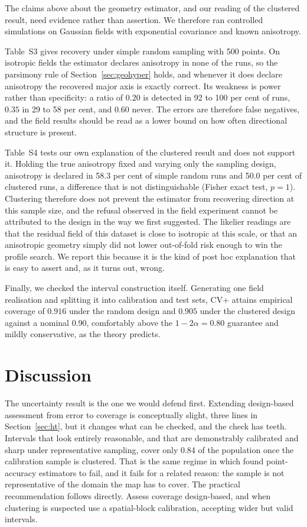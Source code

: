 \documentclass[preprint,12pt,authoryear]{elsarticle}
\begin{document}
The claims above about the geometry estimator, and our reading of the clustered
result, need evidence rather than assertion. We therefore ran controlled
simulations on Gaussian fields with exponential covariance and known anisotropy.

Table~S3 gives recovery under simple random sampling with 500
points. On isotropic fields the estimator declares anisotropy in none of the
runs, so the parsimony rule of Section~\ref{sec:geohyper} holds, and whenever it
does declare anisotropy the recovered major axis is exactly correct. Its
weakness is power rather than specificity: a ratio of $0.20$ is detected in 92
to 100 per cent of runs, $0.35$ in 29 to 58 per cent, and $0.60$ never. The
errors are therefore false negatives, and the field results should be read as a
lower bound on how often directional structure is present.

Table~S4 tests our own explanation of the clustered result and does
not support it. Holding the true anisotropy fixed and varying only the sampling
design, anisotropy is declared in 58.3 per cent of simple random runs and 50.0
per cent of clustered runs, a difference that is not distinguishable
(Fisher exact test, $p = 1$). Clustering therefore does not prevent the
estimator from recovering direction at this sample size, and the refusal
observed in the field experiment cannot be attributed to the design in the way
we first suggested. The likelier readings are that the residual field of this
dataset is close to isotropic at this scale, or that an anisotropic geometry
simply did not lower out-of-fold risk enough to win the profile search. We
report this because it is the kind of post hoc explanation that is easy to
assert and, as it turns out, wrong.

Finally, we checked the interval construction itself. Generating one field
realisation and splitting it into calibration and test sets, CV+ attains
empirical coverage of $0.916$ under the random design and $0.905$ under the
clustered design against a nominal $0.90$, comfortably above the
$1-2\alpha = 0.80$ guarantee and mildly conservative, as the theory predicts.

\section{Discussion}

The uncertainty result is the one we would defend first. Extending design-based
assessment from error to coverage is conceptually slight, three lines in
Section~\ref{sec:ht}, but it changes what can be checked, and the check has
teeth. Intervals that look entirely reasonable, and that are demonstrably
calibrated and sharp under representative sampling, cover only 0.84 of the
population once the calibration sample is clustered. That is the same regime in
which \citet{wadoux2021} found point-accuracy estimators to fail, and it fails
for a related reason: the sample is not representative of the domain the map has
to cover. The practical recommendation follows directly. Assess coverage
design-based, and when clustering is suspected use a spatial-block calibration,
accepting wider but valid intervals.
\end{document}
